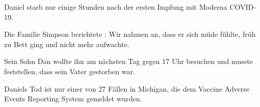 Daniel starb nur einige Stunden nach der ersten Impfung mit Moderna COVID-19.

Die Familie Simpson berichtete : Wir nahmen an, dass er sich müde fühlte, früh
zu Bett ging und nicht mehr aufwachte.

Sein Sohn Dan wollte ihn am nächsten Tag gegen 17 Uhr besuchen und musste
feststellen, dass sein Vater gestorben war.

Daniels Tod ist nur einer von 27 Fällen in Michigan, die dem Vaccine Adverse
Events Reporting System gemeldet wurden.

